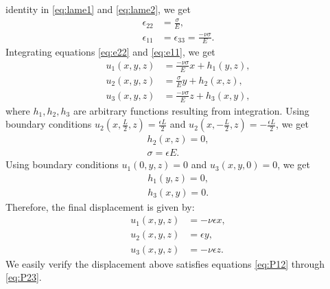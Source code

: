 \documentclass[a4paper]{article}
\begin{document}
identity in \eqref{eq:lame1} and \eqref{eq:lame2}, we get
\begin{align}
	\epsilon_{22} & = \frac{\sigma}{E}\label{eq:e22},                       \\
	\epsilon_{11} & = \epsilon_{33} = \frac{-\nu \sigma}{E}. \label{eq:e11}
\end{align}
Integrating equations \eqref{eq:e22} and \eqref{eq:e11}, we get
\begin{align}
	u_1(x,y,z) & = \frac{-\nu \sigma}{E}x + h_1(y,z), \label{eq:u1} \\
	u_2(x,y,z) & = \frac{\sigma}{E}y + h_2(x,z), \label{eq:u2}      \\
	u_3(x,y,z) & = \frac{-\nu \sigma}{E}z + h_3(x,y), \label{eq:u3}
\end{align}
where $h_1, h_2, h_3$ are arbitrary functions resulting from integration.
Using boundary conditions $u_2(x,\frac{L}{2},z) =\frac{\epsilon L}{2}$ and
$u_2(x,-\frac{L}{2},z) = -\frac{\epsilon L}{2}$, we get
\begin{align*}
	h_2(x,z) = 0, \\
    \sigma = \epsilon E.
\end{align*}
Using boundary conditions $u_1(0,y,z) = 0$ and $u_3(x,y,0) = 0$, we get
\begin{align*}
	h_1(y, z) = 0, \\
	h_3(x, y) = 0.
\end{align*}
Therefore, the final displacement is given by:
\begin{align*}
	u_1(x,y,z) & = -\nu \epsilon x, \\
	u_2(x,y,z) & = \epsilon y,      \\
	u_3(x,y,z) & = -\nu \epsilon z.
\end{align*}
We easily verify the displacement above satisfies equations \eqref{eq:P12}
through \eqref{eq:P23}.
\end{document}
